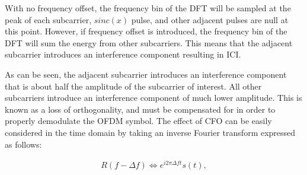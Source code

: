 With no frequency offset, the frequency bin of the DFT will be sampled at  the peak of each subcarrier, $sinc(x)$ pulse, and other adjacent pulses are null at this point.
However, if frequency offset is introduced, the frequency bin of the DFT will sum the energy from other subcarriers.
This means that the adjacent subcarrier introduces an interference component resulting in ICI.

As can be seen, the adjacent subcarrier introduces an interference component that is about half the amplitude of the subcarrier of interest.
All other subcarriers introduce an interference component of much lower amplitude.
This is known as a loss of orthogonality, and must be compensated for in order to properly demodulate the OFDM symbol.
The effect of CFO can be easily considered in the time domain by taking an inverse Fourier transform expressed as follows:

\begin{eqnarray}
\label{equ:}
             R(f - \Delta f) \Leftrightarrow  e^{i2\pi \Delta ft} s(t),
\end{eqnarray}

